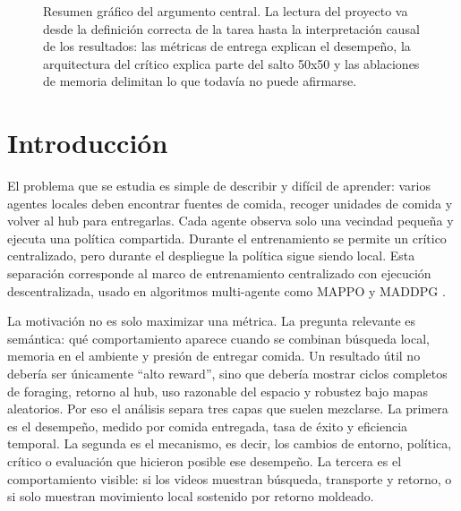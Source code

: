 \documentclass[11pt,a4paper]{article}
\begin{document}
\begin{figure}[h]
\centering
{}
\caption{Resumen gráfico del argumento central. La lectura del proyecto va desde la definición correcta de la tarea hasta la interpretación causal de los resultados: las métricas de entrega explican el desempeño, la arquitectura del crítico explica parte del salto 50x50 y las ablaciones de memoria delimitan lo que todavía no puede afirmarse.}
\label{fig:graphical-abstract}
\end{figure}

\section{Introducción}

El problema que se estudia es simple de describir y difícil de aprender: varios agentes locales deben encontrar fuentes de comida, recoger unidades de comida y volver al hub para entregarlas. Cada agente observa solo una vecindad pequeña y ejecuta una política compartida. Durante el entrenamiento se permite un crítico centralizado, pero durante el despliegue la política sigue siendo local. Esta separación corresponde al marco de entrenamiento centralizado con ejecución descentralizada, usado en algoritmos multi-agente como MAPPO y MADDPG \cite{yu2022mappo,lowe2017maddpg}.

La motivación no es solo maximizar una métrica. La pregunta relevante es semántica: qué comportamiento aparece cuando se combinan búsqueda local, memoria en el ambiente y presión de entregar comida. Un resultado útil no debería ser únicamente ``alto reward'', sino que debería mostrar ciclos completos de foraging, retorno al hub, uso razonable del espacio y robustez bajo mapas aleatorios. Por eso el análisis separa tres capas que suelen mezclarse. La primera es el desempeño, medido por comida entregada, tasa de éxito y eficiencia temporal. La segunda es el mecanismo, es decir, los cambios de entorno, política, crítico o evaluación que hicieron posible ese desempeño. La tercera es el comportamiento visible: si los videos muestran búsqueda, transporte y retorno, o si solo muestran movimiento local sostenido por retorno moldeado.
\end{document}
